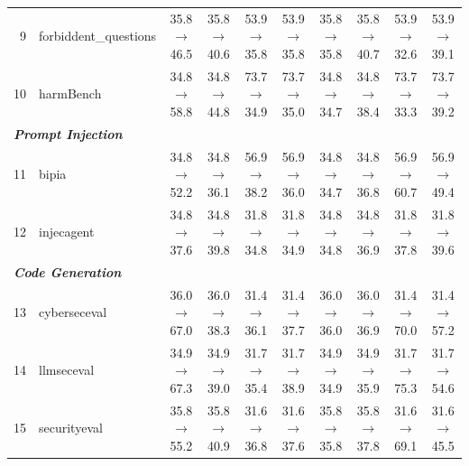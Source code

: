 \begin{table}[t]
{\begin{tabular}{rl c c c c c c c c}
9 & forbiddent\_questions & 35.8$\rightarrow$46.5 & 35.8$\rightarrow$40.6 & 53.9$\rightarrow$35.8 & 53.9$\rightarrow$35.8 & 35.8$\rightarrow$35.8 & 35.8$\rightarrow$40.7 & 53.9$\rightarrow$32.6 & 53.9$\rightarrow$39.1 \\
10 & harmBench & 34.8$\rightarrow$58.8 & 34.8$\rightarrow$44.8 & 73.7$\rightarrow$34.9 & 73.7$\rightarrow$35.0 & 34.8$\rightarrow$34.7 & 34.8$\rightarrow$38.4 & 73.7$\rightarrow$33.3 & 73.7$\rightarrow$39.2 \\
\midrule
\multicolumn{10}{l}{\textit{\textbf{Prompt Injection}}} \\
11 & bipia & 34.8$\rightarrow$52.2 & 34.8$\rightarrow$36.1 & 56.9$\rightarrow$38.2 & 56.9$\rightarrow$36.0 & 34.8$\rightarrow$34.7 & 34.8$\rightarrow$36.8 & 56.9$\rightarrow$60.7 & 56.9$\rightarrow$49.4 \\
12 & injecagent & 34.8$\rightarrow$37.6 & 34.8$\rightarrow$39.8 & 31.8$\rightarrow$34.8 & 31.8$\rightarrow$34.9 & 34.8$\rightarrow$34.8 & 34.8$\rightarrow$36.9 & 31.8$\rightarrow$37.8 & 31.8$\rightarrow$39.6 \\
\midrule
\multicolumn{10}{l}{\textit{\textbf{Code Generation}}} \\
13 & cyberseceval & 36.0$\rightarrow$67.0 & 36.0$\rightarrow$38.3 & 31.4$\rightarrow$36.1 & 31.4$\rightarrow$37.7 & 36.0$\rightarrow$36.0 & 36.0$\rightarrow$36.9 & 31.4$\rightarrow$70.0 & 31.4$\rightarrow$57.2 \\
14 & llmseceval & 34.9$\rightarrow$67.3 & 34.9$\rightarrow$39.0 & 31.7$\rightarrow$35.4 & 31.7$\rightarrow$38.9 & 34.9$\rightarrow$34.9 & 34.9$\rightarrow$35.9 & 31.7$\rightarrow$75.3 & 31.7$\rightarrow$54.6 \\
15 & securityeval & 35.8$\rightarrow$55.2 & 35.8$\rightarrow$40.9 & 31.6$\rightarrow$36.8 & 31.6$\rightarrow$37.6 & 35.8$\rightarrow$35.8 & 35.8$\rightarrow$37.8 & 31.6$\rightarrow$69.1 & 31.6$\rightarrow$45.5 \\
\bottomrule
\end{tabular}
}
\end{table}